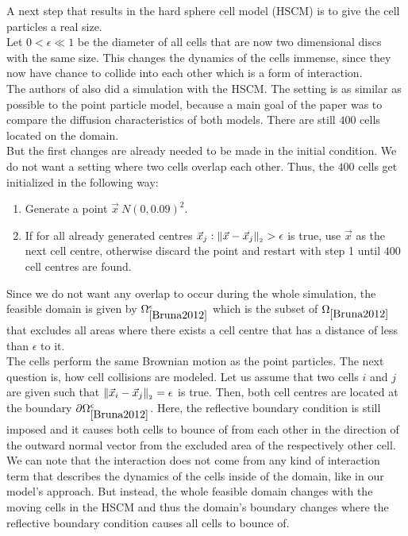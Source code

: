 A next step that results in the hard sphere cell model (HSCM) is to give the cell particles a real size. \\
Let $0 < \epsilon \ll 1$ be the diameter of all cells that are now two dimensional discs with the same size. 
This changes the dynamics of the cells immense, since they now have chance to collide into each other which is a form of interaction. \\
The authors of \cite{Bruna2012} also did a simulation with the HSCM. 
The setting is as similar as possible to the point particle model, because a main goal of the paper was to compare the diffusion characteristics of both models. 
There are still $400$ cells located on the domain. \\
But the first changes are already needed to be made in the initial condition.  
We do not want a setting where two cells overlap each other. 
Thus, the $400$ cells get initialized in the following way:
\begin{enumerate}
    \item Generate a point $\vec{x} ~ N(0,0.09)^2$. 
    \item If for all already generated centres $\vec{x}_j: \norm[\vec{x} - \vec{x}_j] > \epsilon$ is true, use $\vec{x}$ as the next cell centre, otherwise discard the point and restart with step 1 until $400$ cell centres are found.   
\end{enumerate}
Since we do not want any overlap to occur during the whole simulation, the feasible domain is given by $\Omega_{\cite{Bruna2012}}^{\epsilon}$ which is the subset of $\Omega_{\cite{Bruna2012}}$ that excludes all areas where there exists a cell centre that has a distance of less than $\epsilon$ to it. \\
The cells perform the same Brownian motion as the point particles. 
The next question is, how cell collisions are modeled. 
Let us assume that two cells $i$ and $j$ are given such that $\norm[\vec{x}_i - \vec{x}_j] = \epsilon$ is true. 
Then, both cell centres are located at the boundary $\partial \Omega_{\cite{Bruna2012}}^{\epsilon}$. 
Here, the reflective boundary condition is still imposed and it causes both cells to bounce of from each other in the direction of the outward normal vector from the excluded area of the respectively other cell. \\ 
We can note that the interaction does not come from any kind of interaction term that describes the dynamics of the cells inside of the domain, like in our model's approach.
But instead, the whole feasible domain changes with the moving cells in the HSCM and thus the domain's boundary changes where the reflective boundary condition causes all cells to bounce of. \\ 

